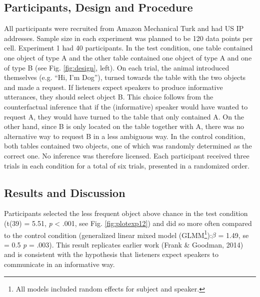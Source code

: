 \documentclass[10pt, letterpaper]{article}
\begin{document}
\subsection{Participants, Design and
Procedure}\label{participants-design-and-procedure}

All participants were recruited from Amazon Mechanical Turk and had US
IP addresses. Sample size in each experiment was planned to be 120 data
points per cell. Experiment 1 had 40 participants. In the test
condition, one table contained one object of type A and the other table
contained one object of type A and one of type B (see Fig.
\ref{fig:design}, left). On each trial, the animal introduced themselves
(e.g. ``Hi, I'm Dog''), turned towards the table with the two objects
and made a request. If listeners expect speakers to produce informative
utterances, they should select object B. This choice follows from the
counterfactual inference that if the (informative) speaker would have
wanted to request A, they would have turned to the table that only
contained A. On the other hand, since B is only located on the table
together with A, there was no alternative way to request B in a less
ambiguous way. In the control condition, both tables contained two
objects, one of which was randomly determined as the correct one. No
inference was therefore licensed. Each participant received three trials
in each condition for a total of six trials, presented in a randomized
order.

\subsection{Results and Discussion}\label{results-and-discussion}

Participants selected the less frequent object above chance in the test
condition (t(39) = 5.51, \emph{p} \textless{} .001, see Fig.
\ref{fig:plotexp12}) and did so more often compared to the control
condition (generalized linear mixed model
(GLMM\footnote{All models included random effects for subject and speaker.}):\emph{\(\beta\)}
= 1.49, se = 0.5 \emph{p} = .003). This result replicates earlier work
(Frank \& Goodman, 2014) and is consistent with the hypothesis that
listeners expect speakers to communicate in an informative way.
\end{document}
